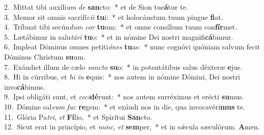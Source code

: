 {2.~}Mittat tibi auxíli\textit{um} \textit{de} \textbf{san}cto:~* et de Sion tue\textbf{á}tur te.\\
{3.~}Memor sit omnis sacrifí\textit{ci}\textit{i} \textbf{tu}i:~* et holocáustum tuum pingue \textbf{fi}at.\\
{4.~}Tríbuat tibi secún\textit{dum} \textit{cor} \textbf{tu}um:~* et omne consílium tuum con\textbf{fír}met.\\
{5.~}Lætábimur in salu\textit{tá}\textit{ri} \textbf{tu}o:~* et in nómine Dei nostri magnifi\textbf{cá}bimur.\\
{6.~}Impleat Dóminus omnes petiti\textit{ó}\textit{nes} \textbf{tu}as:~* nunc cognóvi quóniam salvum fecit Dóminus Christum \textbf{su}um.\\
{7.~}Exáudiet illum de cælo \textit{san}\textit{cto} \textbf{su}o:~* in potentátibus salus déxteræ \textbf{e}jus.\\
{8.~}Hi in cúrribus, et \textit{hi} \textit{in} \textbf{e}quis:~* nos autem in nómine Dómini, Dei nostri invo\textbf{cá}bimus.\\
{9.~}Ipsi obligáti sunt, et \textit{ce}\textit{ci}\textbf{dé}runt:~* nos autem surréximus et erécti \textbf{su}mus.\\
{10.~}Dómine sal\textit{vum} \textit{fac} \textbf{re}gem:~* et exáudi nos in die, qua invocavéri\textbf{mus} te.\\
{11.~}Glória Pa\textit{tri}, \textit{et} \textbf{Fí}lio,~* et Spirítui \textbf{San}cto.\\
{12.~}Sicut erat in princípio, et \textit{nunc}, \textit{et} \textbf{sem}per,~* et in sǽcula sæculórum. \textbf{A}men.\\
